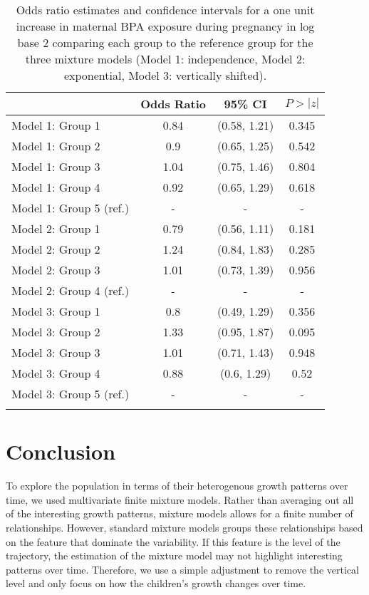 \begin{table}[ht]
\begin{center}
\begin{tabular}{lccc}
  \thickhline
 & Odds Ratio & 95\% CI & $P>|z|$ \\ 
  \hline
Model 1: Group  1 & 0.84 & (0.58, 1.21) & 0.345 \\ 
  Model 1: Group  2 & 0.9 & (0.65, 1.25) & 0.542 \\ 
  Model 1: Group  3 & 1.04 & (0.75, 1.46) & 0.804 \\ 
  Model 1: Group  4 & 0.92 & (0.65, 1.29) & 0.618 \\ 
  Model 1: Group  5  (ref.) & - & - & - \\ 
  Model 2: Group  1 & 0.79 & (0.56, 1.11) & 0.181 \\ 
  Model 2: Group  2 & 1.24 & (0.84, 1.83) & 0.285 \\ 
  Model 2: Group  3 & 1.01 & (0.73, 1.39) & 0.956 \\ 
  Model 2: Group  4  (ref.) & - & - & - \\ 
  Model 3: Group  1 & 0.8 & (0.49, 1.29) & 0.356 \\ 
  Model 3: Group  2 & 1.33 & (0.95, 1.87) & 0.095 \\ 
  Model 3: Group  3 & 1.01 & (0.71, 1.43) & 0.948 \\ 
  Model 3: Group  4 & 0.88 & (0.6, 1.29) & 0.52 \\ 
  Model 3: Group  5  (ref.) & - & - & - \\ 
   \thickhline
\end{tabular}
\caption{Odds ratio estimates and confidence intervals for a one unit increase in maternal BPA exposure during pregnancy in log base 2 comparing each group to the reference group for the three mixture models (Model 1: independence, Model 2: exponential, Model 3: vertically shifted). }
\end{center}
\label{tab:6-2}
\end{table}

\section{Conclusion}
To explore the population in terms of their heterogenous growth patterns over time, we used multivariate finite mixture models. Rather than averaging out all of the interesting growth patterns, mixture models allows for a finite number of relationships. However, standard mixture models groups these relationships based on the feature that dominate the variability. If this feature is the level of the trajectory, the estimation of the mixture model may not highlight interesting patterns over time. Therefore, we use a simple adjustment to remove the vertical level and only focus on how the children's growth changes over time.

